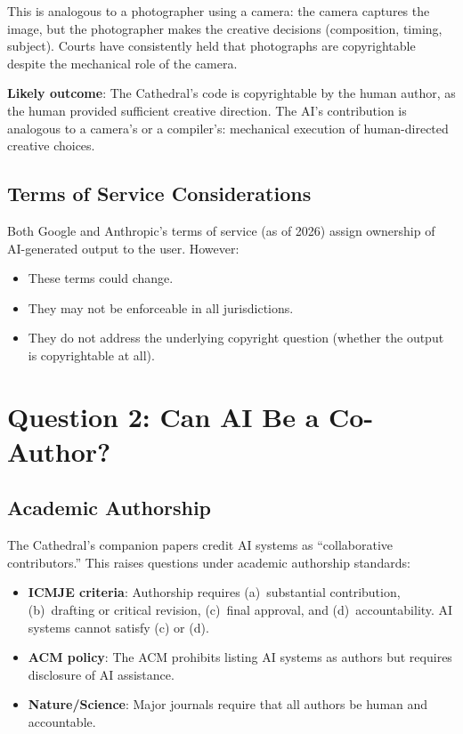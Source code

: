 \documentclass[11pt,a4paper]{article}
\begin{document}
This is analogous to a photographer using a camera: the camera
captures the image, but the photographer makes the creative
decisions (composition, timing, subject). Courts have consistently
held that photographs are copyrightable despite the mechanical
role of the camera.

\textbf{Likely outcome}: The Cathedral's code is copyrightable by
the human author, as the human provided sufficient creative
direction. The AI's contribution is analogous to a camera's or a
compiler's: mechanical execution of human-directed creative choices.

\subsection{Terms of Service Considerations}

Both Google and Anthropic's terms of service (as of 2026) assign
ownership of AI-generated output to the user. However:

\begin{itemize}
  \item These terms could change.
  \item They may not be enforceable in all jurisdictions.
  \item They do not address the underlying copyright question
    (whether the output is copyrightable at all).
\end{itemize}

\section{Question 2: Can AI Be a Co-Author?}
\label{sec:authorship}

\subsection{Academic Authorship}

The Cathedral's companion papers credit AI systems as
``collaborative contributors.'' This raises questions under
academic authorship standards:

\begin{itemize}
  \item \textbf{ICMJE criteria}: Authorship requires (a)~substantial
    contribution, (b)~drafting or critical revision, (c)~final
    approval, and (d)~accountability. AI systems cannot satisfy
    (c) or (d).
  \item \textbf{ACM policy}: The ACM prohibits listing AI systems
    as authors but requires disclosure of AI assistance.
  \item \textbf{Nature/Science}: Major journals require that all
    authors be human and accountable.
\end{itemize}
\end{document}

